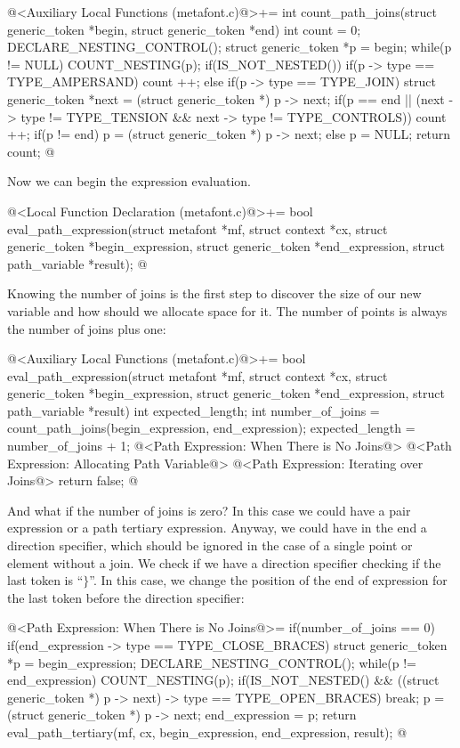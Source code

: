\iniciocodigo
@<Auxiliary Local Functions (metafont.c)@>+=
int count_path_joins(struct generic_token *begin, struct generic_token *end){
int count = 0;
  DECLARE_NESTING_CONTROL();
  struct generic_token *p = begin;
  while(p != NULL){
    COUNT_NESTING(p);
    if(IS_NOT_NESTED()){
      if(p -> type == TYPE_AMPERSAND)
        count ++;
      else if(p -> type == TYPE_JOIN){
        struct generic_token *next = (struct generic_token *) p -> next;
        if(p == end || (next -> type !=  TYPE_TENSION &&
                        next -> type != TYPE_CONTROLS))
          count ++;
      }
    }
    if(p != end)
      p = (struct generic_token *) p -> next;
    else
      p = NULL;
  }
  return count;
}
@
\fimcodigo

Now we can begin the expression evaluation.

\iniciocodigo
@<Local Function Declaration (metafont.c)@>+=
bool eval_path_expression(struct metafont *mf, struct context *cx,
                          struct generic_token *begin_expression,
                          struct generic_token *end_expression,
                          struct path_variable *result);
@
\fimcodigo

Knowing the number of joins is the first step to discover the size of
our new variable and how should we allocate space for it. The number
of points is always the number of joins plus one:

\iniciocodigo
@<Auxiliary Local Functions (metafont.c)@>+=
bool eval_path_expression(struct metafont *mf, struct context *cx,
                          struct generic_token *begin_expression,
                          struct generic_token *end_expression,
                          struct path_variable *result){
  int expected_length;
  int number_of_joins = count_path_joins(begin_expression, end_expression);
  expected_length = number_of_joins + 1;
  @<Path Expression: When There is No Joins@>
  @<Path Expression: Allocating Path Variable@>
  @<Path Expression: Iterating over Joins@>
  return false;
}
@
\fimcodigo

And what if the number of joins is zero? In this case we could have a
pair expression or a path tertiary expression. Anyway, we could have
in the end a direction specifier, which should be ignored in the case
of a single point or element without a join. We check if we have a
direction specifier checking if the last token is ``$\}$''. In this case,
we change the position of the end of expression for the last token
before the direction specifier:

\iniciocodigo
@<Path Expression: When There is No Joins@>=
if(number_of_joins == 0){
  if(end_expression -> type == TYPE_CLOSE_BRACES){
    struct generic_token *p = begin_expression;
    DECLARE_NESTING_CONTROL();
    while(p != end_expression){
      COUNT_NESTING(p);
      if(IS_NOT_NESTED() &&
         ((struct generic_token *) p -> next) -> type == TYPE_OPEN_BRACES)
        break;
      p = (struct generic_token *) p -> next;
    }
    end_expression = p;
  }
  return eval_path_tertiary(mf, cx, begin_expression, end_expression,
                           result);
}
@
\fimcodigo

